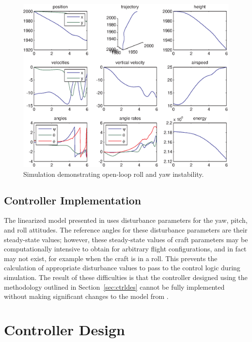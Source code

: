 \documentclass{sydeStyle}
\begin{document}
\begin{figure}
    \begin{center}
        \includegraphics[width=0.8\columnwidth]{figs/rollunstable}
    \end{center}
    \caption{Simulation demonstrating open-loop roll and yaw instability.}
    \label{fig:rollinstability}
\end{figure}

\subsection{Controller Implementation}
\label{sec:ctrlimpl}
The linearized model presented in \cite{spottiswoode} uses disturbance
parameters for the yaw, pitch, and roll attitudes.  The reference angles for
these disturbance parameters are their steady-state values; however, these
steady-state values of craft parameters may be computationally
intensive to obtain for arbitrary flight configurations, and in fact may not
exist, for example when the craft is in a roll.
This prevents the calculation of appropriate disturbance values to
pass to the control logic during simulation.  The result of these difficulties
is that the controller designed using the methodology outlined in
Section~\ref{sec:ctrldes} cannot be fully implemented without making significant
changes to the model from \cite{spottiswoode}.

\section{Controller Design}

\end{document}
